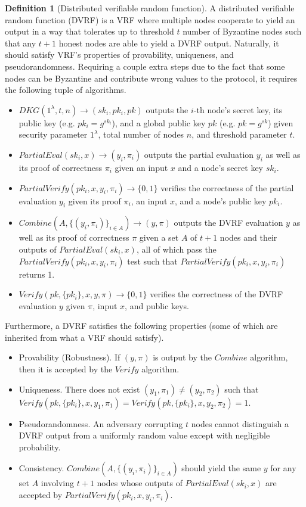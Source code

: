 \documentclass[letterpaper,twocolumn,10pt]{article}
\theoremstyle{definition}
\newtheorem{definition}[theorem]{Definition}
\theoremstyle{remark}
\begin{document}
\begin{definition}[Distributed verifiable random function]
A distributed verifiable random function (DVRF) is a VRF where multiple nodes cooperate to yield an output in a way that tolerates up to threshold $t$ number of Byzantine nodes such that any $t + 1$ honest nodes are able to yield a DVRF output. Naturally, it should satisfy VRF's properties of provability, uniqueness, and pseudorandomness. Requiring a couple extra steps due to the fact that some nodes can be Byzantine and contribute wrong values to the protocol, it requires the following tuple of algorithms.
\begin{itemize}
\item $DKG(1^\lambda, t, n) \rightarrow (sk_i, pk_i, pk)$ outputs the $i$-th node's secret key, its public key (e.g. $pk_i = g^{sk_i}$), and a global public key $pk$ (e.g. $pk = g^{sk}$) given security parameter $1^\lambda$, total number of nodes $n$, and threshold parameter $t$.
\item $PartialEval(sk_i, x) \rightarrow (y_i, \pi_i)$ outputs the partial evaluation $y_i$ as well as its proof of correctness $\pi_i$ given an input $x$ and a node's secret key $sk_i$.
\item $PartialVerify(pk_i, x, y_i, \pi_i) \rightarrow \{0, 1\}$ verifies the correctness of the partial evaluation $y_i$ given its proof $\pi_i$, an input $x$, and a node's public key $pk_i$.
\item $Combine(A, \{(y_i, \pi_i)\}_{i \in A}) \rightarrow (y, \pi)$ outputs the DVRF evaluation $y$ as well as its proof of correctness $\pi$ given a set $A$ of $t + 1$ nodes and their outputs of $PartialEval(sk_i, x)$, all of which pass the $PartialVerify(pk_i, x, y_i, \pi_i)$ test such that $PartialVerify(pk_i, x, y_i, \pi_i)$ returns 1.
\item $Verify(pk, \{pk_i\}, x, y, \pi) \rightarrow \{0, 1\}$ verifies the correctness of the DVRF evaluation $y$ given $\pi$, input $x$, and public keys.
\end{itemize}

Furthermore, a DVRF satisfies the following properties (some of which are inherited from what a VRF should satisfy).
\begin{itemize}
\item Provability (Robustness). If $(y, \pi)$ is output by the $Combine$ algorithm, then it is accepted by the $Verify$ algorithm.
\item Uniqueness. There does not exist $(y_1, \pi_1) \neq (y_2, \pi_2)$ such that $Verify(pk, \{pk_i\}, x, y_1, \pi_1) = Verify(pk, \{pk_i\}, x, y_2, \pi_2) = 1$.
\item Pseudorandomness. An adversary corrupting $t$ nodes cannot distinguish a DVRF output from a uniformly random value except with negligible probability.
\item Consistency. $Combine(A, \{(y_i, \pi_i)\}_{i \in A})$ should yield the same $y$ for any set $A$ involving $t + 1$ nodes whose outputs of $PartialEval(sk_i, x)$ are accepted by $PartialVerify(pk_i, x, y_i, \pi_i)$.
\end{itemize}
\end{definition}
\end{document}
